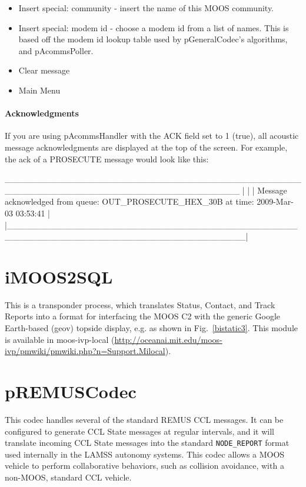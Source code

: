 \documentclass[11pt, letterpaper, oneside]{memoir}
\begin{document}
\begin{itemize}
\begin{itemize}
\item Insert special: community - insert the name of this MOOS community.
\item Insert special: modem id - choose a modem id from a list of names. This is based off the modem id lookup table used by pGeneralCodec's algorithms, and pAcommsPoller.
\item Clear message
\item Main Menu
\end{itemize}

\paragraph{Acknowledgments}
If you are using pAcommsHandler with the ACK field set to 1 (true), all acoustic message acknowledgments are displayed at the top of the screen. For example, the ack of a PROSECUTE message would look like this:
\begin{boxedverbatim}
  ______________________________________________________________________________________
 |                                                                                      |
 | Message acknowledged from queue: OUT_PROSECUTE_HEX_30B at time: 2009-Mar-03 03:53:41 |
 |______________________________________________________________________________________|
\end{boxedverbatim}
\resetbvlinenumber

 
\section{iMOOS2SQL}

This is a transponder process, which translates Status, Contact, and
Track Reports into a format for interfacing the MOOS C2 with the
generic Google Earth-based (geov) topside display, e.g. as shown in
Fig.~\ref{bistatic3}. This module is available in moos-ivp-local (\url{http://oceanai.mit.edu/moos-ivp/pmwiki/pmwiki.php?n=Support.Milocal}).

\section{pREMUSCodec}

This codec handles several of the standard REMUS CCL messages. It can be configured to generate CCL State messages at regular
intervals, and it will translate incoming CCL State messages into the
standard \verb|NODE_REPORT| format used internally in the LAMSS autonomy
systems. This codec allows a MOOS vehicle to perform collaborative
behaviors, such as collision avoidance, with a non-MOOS, standard CCL vehicle.


\end{itemize}
\end{document}
